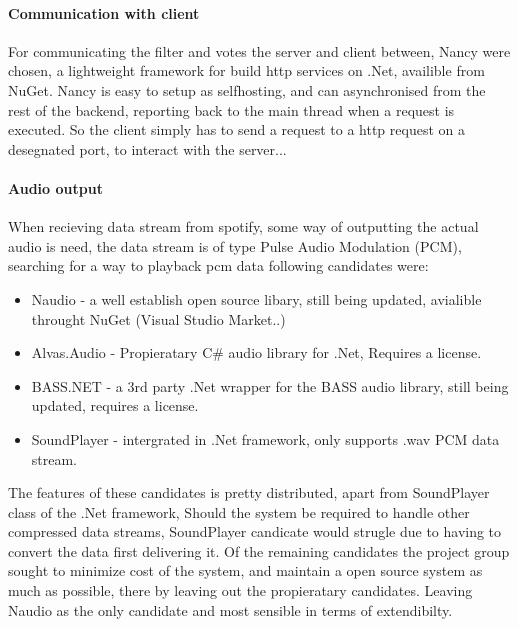 	\paragraph{Communication with client}
	For communicating the filter and votes the server and client between, Nancy \cite{nancy} were chosen, a lightweight framework for build http services on .Net, availible from NuGet. Nancy is easy to setup as selfhosting, and can asynchronised from the rest of the backend, reporting back to the main thread when a request is executed. So the client simply has to send a request to a http request on a desegnated port, to interact with the server...  

	\paragraph{Audio output}
	When recieving data stream from spotify, some way of outputting the actual audio is need, the data stream is of type Pulse Audio Modulation (PCM), searching for a way to playback pcm data following candidates were:

\begin{itemize}
	\item Naudio \cite{naudio} - a well establish open source libary, still being updated, avialible throught NuGet (Visual Studio Market..)
	\item Alvas.Audio \cite{alvas} - Propieratary C\# audio library for .Net, Requires a license.
	\item BASS.NET \cite{bass} - a 3rd party .Net wrapper for the BASS audio library, still being updated, requires a license.
	\item SoundPlayer - intergrated in .Net framework, only supports .wav PCM data stream.
\end{itemize}

	The features of these candidates is pretty distributed, apart from SoundPlayer class of the .Net framework, Should the system be required to handle other compressed data streams, SoundPlayer candicate would strugle due to having to convert the data first delivering it. Of the remaining candidates the project group sought to minimize cost of the system, and maintain a open source system as much as possible, there by leaving out the propieratary candidates. Leaving Naudio as the only candidate and most sensible in terms of extendibilty.